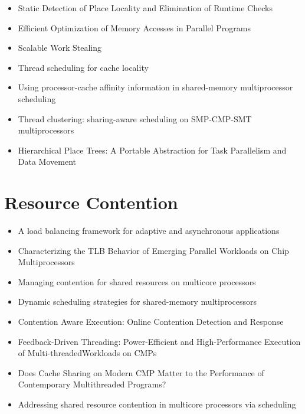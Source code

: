 \begin{itemize}
\item Static Detection of Place Locality and Elimination of Runtime
  Checks \cite{Agarwal2008}
\item Efficient Optimization of Memory Accesses in Parallel Programs
  \cite{Barik2009}
\item Scalable Work Stealing \cite{Dinan2009}
\item Thread scheduling for cache locality \cite{Philbin1996}
\item Using processor-cache affinity information in shared-memory
  multiprocessor scheduling \cite{Squillante1993}
\item Thread clustering: sharing-aware scheduling on SMP-CMP-SMT
  multiprocessors \cite{Tam2007}
\item Hierarchical Place Trees: A Portable Abstraction for Task
  Parallelism and Data Movement \cite{Yan2009}
\end{itemize}


\section{Resource Contention}
\label{sec:lr-resource-contention}

\begin{itemize}
\item A load balancing framework for adaptive and asynchronous
  applications \cite{Barker2004}
\item Characterizing the TLB Behavior of Emerging Parallel Workloads
  on Chip Multiprocessors \cite{Bhattacharjee2009}
\item Managing contention for shared resources on multicore processors
  \cite{Fedorova2010}
\item Dynamic scheduling strategies for shared-memory multiprocessors
  \cite{Hamidzadeh1996}
\item Contention Aware Execution: Online Contention Detection and
  Response \cite{Soffa2010}
\item Feedback-Driven Threading: Power-Efficient and High-Performance
  Execution of Multi-threadedWorkloads on CMPs \cite{Suleman2008}
\item Does Cache Sharing on Modern CMP Matter to the Performance of
  Contemporary Multithreaded Programs? \cite{Zhang2010}
\item Addressing shared resource contention in multicore processors
  via scheduling \cite{Zhuravlev2010}
\end{itemize}


